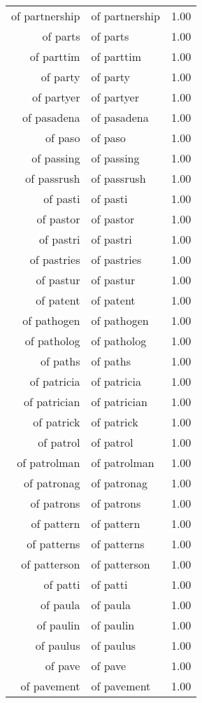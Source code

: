 \begin{table}[ht]
\begin{tabular}{rlr}
  of partnership & of partnership & 1.00 \\ 
  of parts & of parts & 1.00 \\ 
  of parttim & of parttim & 1.00 \\ 
  of party & of party & 1.00 \\ 
  of partyer & of partyer & 1.00 \\ 
  of pasadena & of pasadena & 1.00 \\ 
  of paso & of paso & 1.00 \\ 
  of passing & of passing & 1.00 \\ 
  of passrush & of passrush & 1.00 \\ 
  of pasti & of pasti & 1.00 \\ 
  of pastor & of pastor & 1.00 \\ 
  of pastri & of pastri & 1.00 \\ 
  of pastries & of pastries & 1.00 \\ 
  of pastur & of pastur & 1.00 \\ 
  of patent & of patent & 1.00 \\ 
  of pathogen & of pathogen & 1.00 \\ 
  of patholog & of patholog & 1.00 \\ 
  of paths & of paths & 1.00 \\ 
  of patricia & of patricia & 1.00 \\ 
  of patrician & of patrician & 1.00 \\ 
  of patrick & of patrick & 1.00 \\ 
  of patrol & of patrol & 1.00 \\ 
  of patrolman & of patrolman & 1.00 \\ 
  of patronag & of patronag & 1.00 \\ 
  of patrons & of patrons & 1.00 \\ 
  of pattern & of pattern & 1.00 \\ 
  of patterns & of patterns & 1.00 \\ 
  of patterson & of patterson & 1.00 \\ 
  of patti & of patti & 1.00 \\ 
  of paula & of paula & 1.00 \\ 
  of paulin & of paulin & 1.00 \\ 
  of paulus & of paulus & 1.00 \\ 
  of pave & of pave & 1.00 \\ 
  of pavement & of pavement & 1.00 \\ 

\end{tabular}
\end{table}

